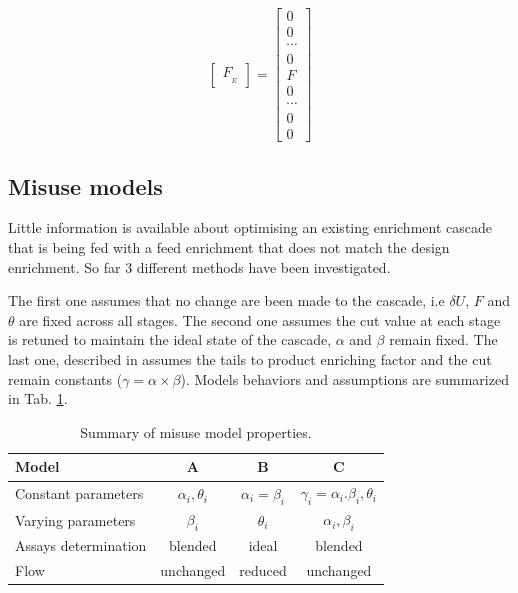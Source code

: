 \begin{equation}
\begin{bmatrix}
     F_{_{E}}
 \end{bmatrix}
 =
 \begin{bmatrix}
     0      \\
     0      \\
     \cdots \\
     0      \\
     F      \\
     0      \\
     \cdots \\
     0      \\
     0
\end{bmatrix}
\label{eq_flow}
\end{equation}



\subsection{Misuse models}

Little information is available about optimising an existing enrichment cascade
that is being fed with a feed enrichment that does not match the design
enrichment. So far 3 different methods have been investigated.

The first one assumes that no change are been made to the cascade, i.e $\delta
U$, $F$ and $\theta$ are fixed across all stages. The second one assumes the cut
value at each stage is retuned to maintain the ideal state of the cascade,
$\alpha$ and $\beta$ remain fixed. The last one, described in \cite{walker.2017}
assumes the tails to product enriching factor and the cut remain constants ($\gamma =
\alpha\times\beta$). Models behaviors and assumptions are summarized in Tab.
\ref{tab:models}.

\begin{table}[htb]
\centering
  \caption{Summary of misuse model properties.}
\begin{tabular}{l|ccc}
\toprule

Model                &    A                 & B                  & C  \\
\midrule
Constant parameters  & $\alpha_i, \theta_i$ & $\alpha_i=\beta_i$ & $\gamma_i=\alpha_i .\beta_i, \theta_i$       \\
Varying parameters   & $\beta_i$            & $\theta_i$         & $\alpha_i, \beta_i$                     \\
Assays determination & blended              & ideal              & blended                  \\
Flow                 & unchanged            & reduced            & unchanged       \\

\bottomrule
\end{tabular}
  \label{tab:models}
\end{table}

